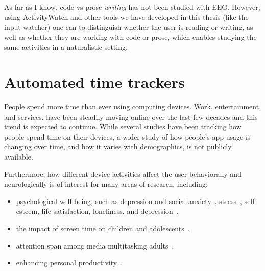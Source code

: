         As far as I know, code vs prose \emph{writing} has not been studied with EEG\@. However, using ActivityWatch and other tools we have developed in this thesis (like the input watcher) one can to distinguish whether the user is reading or writing, as well as whether they are working with code or prose, which enables studying the same activities in a naturalistic setting.





\vfill
\pagebreak
\section{Automated time trackers}

    People spend more time than ever using computing devices. Work, entertainment, and services, have been steadily moving online over the last few decades and this trend is expected to continue. While several studies have been tracking how people spend time on their devices, a wider study of how people's app usage is changing over time, and how it varies with demographics, is not publicly available.

    Furthermore, how different device activities affect the user behaviorally and neurologically is of interest for many areas of research, including:

    \begin{itemize}
        \item psychological well-being, such as depression and social anxiety~\cite{selfhout_different_2009,shah_nonrecursive_2002}, stress~\cite{mark_stress_2014}, self-esteem, life satisfaction, loneliness, and depression~\cite{huang_time_2017}.
        \item the impact of screen time on children and adolescents~\cite{subrahmanyam_impact_2001}.
        \item attention span among media multitasking adults~\cite{mark_stress_2014}.
        \item enhancing personal productivity~\cite{kim_timeaware_2016}.
    \end{itemize}

